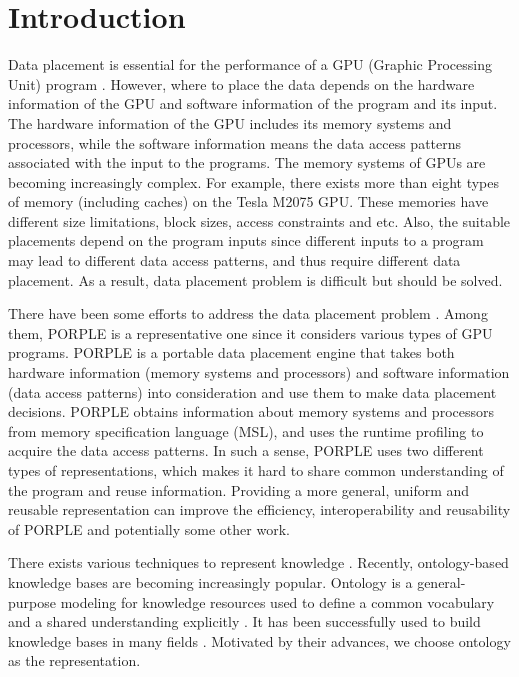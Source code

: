 \documentclass{sig-alternate}
\begin{document}
\section{Introduction}
Data placement is essential for the performance of a GPU (Graphic Processing Unit) program \cite{related1}. However, where to place the data depends on the hardware information of the GPU and software information of the program and its input. The hardware information of the GPU includes its memory systems and processors, while the software information means the data access patterns associated with the input to the programs. The memory systems of GPUs are becoming increasingly complex. For example, there exists more than eight types of memory (including caches) on the Tesla M2075 GPU. These memories have different size limitations, block sizes, access constraints and etc. Also, the suitable placements depend on the program inputs since different inputs to a program may lead to different data access patterns, and thus require different data placement. As a result, data placement problem is difficult but should be solved.

There have been some efforts to address the data placement problem \cite{related1, related2, related3, porple}. Among them, PORPLE \cite{porple} is a representative one since it considers various types of GPU programs. PORPLE is a portable data placement engine that takes both hardware information (memory systems and processors) and software information (data access patterns) into consideration and use them to make data placement decisions. PORPLE obtains information about memory systems and processors from memory specification language (MSL), and uses the runtime profiling to acquire the data access patterns. In such a sense, PORPLE uses two different types of representations, which makes it hard to share common understanding of the program and reuse information. Providing a more general, uniform and reusable representation can improve the efficiency, interoperability and reusability of PORPLE and potentially some other work.

There exists various techniques to represent knowledge \cite{intro2}. Recently, ontology-based knowledge bases are becoming increasingly popular. Ontology is a general-purpose modeling for knowledge resources used to define a common vocabulary and a shared understanding explicitly \cite{ontology1, ontology2}. It has been successfully used to build knowledge bases in many fields \cite{ontology3, ontology4, ontology5, ontology6}. Motivated by their advances, we choose ontology as the representation.
\end{document}
